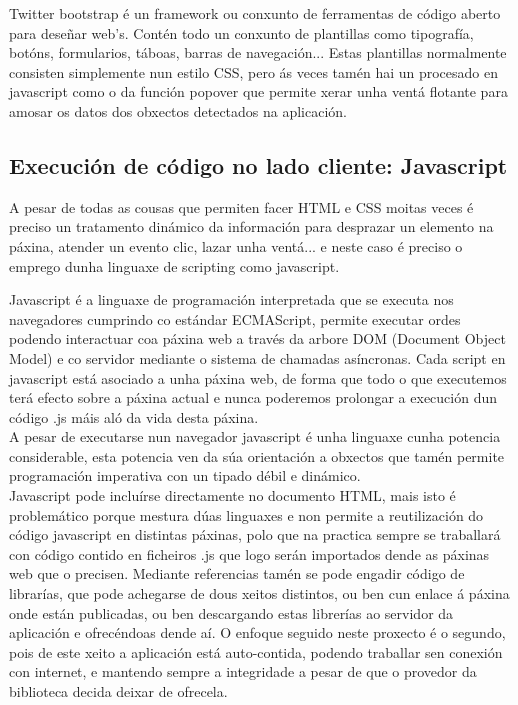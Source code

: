             Twitter bootstrap é un framework ou conxunto de ferramentas de código aberto para 
            deseñar web's. Contén todo un conxunto de plantillas como tipografía, botóns, formularios,
            táboas, barras de navegación... Estas plantillas normalmente consisten simplemente nun
            estilo CSS, pero ás veces tamén hai un procesado en javascript como o da función popover
            que permite xerar unha ventá flotante para amosar os datos dos obxectos detectados na 
            aplicación.
            
    \subsection{Execución de código no lado cliente: Javascript}
        A pesar de todas as cousas que permiten facer HTML e CSS moitas veces é preciso un 
        tratamento dinámico da información para desprazar un elemento na páxina, atender un evento
        clic, lazar unha ventá... e neste caso é preciso o emprego dunha linguaxe de scripting 
        como javascript.
    
        Javascript é a linguaxe de programación interpretada que se executa nos navegadores
        cumprindo co estándar ECMAScript, permite executar ordes podendo interactuar coa páxina 
        web a través da arbore DOM (Document Object Model) e co servidor mediante o sistema de
        chamadas asíncronas. Cada script en javascript está asociado a unha páxina web, de forma
        que todo o que executemos terá efecto sobre a páxina actual e nunca poderemos prolongar
        a execución dun código .js máis aló da vida desta páxina.\\
        
        A pesar de executarse nun navegador javascript é unha linguaxe cunha potencia 
        considerable, esta potencia ven da súa orientación a obxectos que tamén permite 
        programación imperativa con un tipado débil e dinámico.\\
        
        Javascript pode incluírse directamente no documento HTML, mais isto é problemático 
        porque mestura dúas linguaxes e non permite a reutilización do código javascript en
        distintas páxinas, polo que na practica sempre se traballará con código contido en
        ficheiros .js que logo serán importados dende as páxinas web que o precisen. Mediante 
        referencias tamén se pode engadir código de librarías, que pode achegarse de dous xeitos
        distintos, ou ben cun enlace á páxina onde están publicadas, ou ben descargando estas
        librerías ao servidor da aplicación e ofrecéndoas dende aí. O enfoque seguido neste 
        proxecto é o segundo, pois de este xeito a aplicación está auto-contida, podendo traballar
        sen conexión con internet, e mantendo sempre a integridade a pesar de que o provedor
        da biblioteca decida deixar de ofrecela.\\
        
